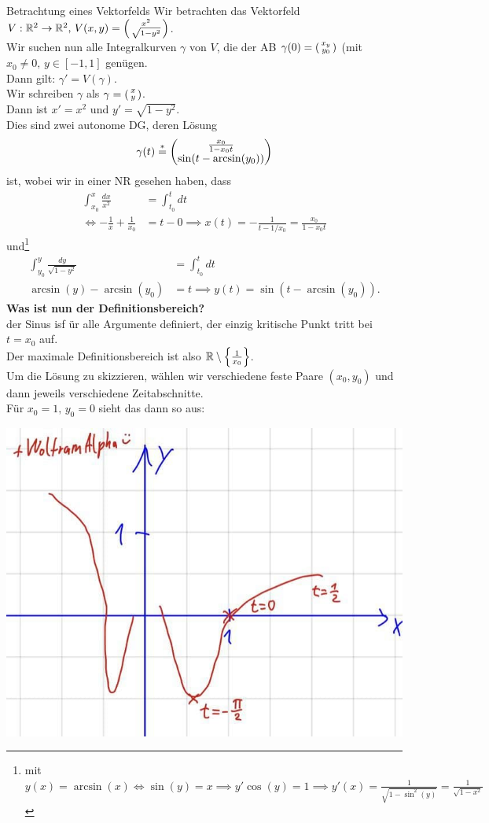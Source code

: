 \begin{Beispiel}
{Betrachtung eines Vektorfelds}
Wir betrachten das Vektorfeld $V:\mathbb{R}^2\to\mathbb{R}^2,\,V(x,y)=\left(\begin{smallmatrix}x^2\\\sqrt{1-y^2}\end{smallmatrix}\right)$.\\
Wir suchen nun alle Integralkurven $\gamma$ von $V$, die der AB $\gamma(0)=\left(\begin{smallmatrix}x_y\\y_0\end{smallmatrix}\right)$ (mit $x_0\neq0,\,y\in[-1,1]$ genügen.\\
Dann gilt: $\gamma'=V(\gamma)$.\\
Wir schreiben $\gamma$ als $\gamma=\left(\begin{smallmatrix}x\\y\end{smallmatrix}\right)$.\\
Dann ist $x'=x^2$ und $y'=\sqrt{1-y^2}$.\\
Dies sind zwei autonome DG, deren Lösung
\begin{equation*}
    \gamma(t)\overset{*}{=}\begin{pmatrix}\frac{x_0}{1-x_0t}\\\sin(t-\arcsin(y_0))\end{pmatrix}
\end{equation*}
ist, wobei wir in einer NR gesehen haben, dass 
\begin{align*}
    \int_{x_0}^x\frac{dx}{x^2}&=\int_{t_0}^tdt\\
    \iff -\frac{1}{x}+\frac{1}{x_0}&=t-0\implies x(t)=-\frac{1}{t-1/x_0}=\frac{x_0}{1-x_0t}
\end{align*}
und\footnote{mit $y(x)=\arcsin(x)\iff \sin(y)=x\implies y'\cos(y)=1\implies y'(x)=\frac{1}{\sqrt{1-\sin^2(y)}}=\frac{1}{\sqrt{1-x^2}}$}
\begin{align*}
    \int_{y_0}^y\frac{dy}{\sqrt{1-y^2}}&=\int_{t_0}^tdt\\
    \arcsin(y)-\arcsin(y_0)&=t\implies y(t)=\sin(t-\arcsin(y_0)).
\end{align*}
\textbf{Was ist nun der Definitionsbereich?}\\
der Sinus isf ür alle Argumente definiert, der einzig kritische Punkt tritt bei $t=x_0$ auf.\\
Der maximale Definitionsbereich ist also $\mathbb{R}\setminus\left\{\frac{1}{x_0}\right\}$.\\
Um die Lösung zu skizzieren, wählen wir verschiedene feste Paare $(x_0,y_0)$ und dann jeweils verschiedene Zeitabschnitte.\\
Für $x_0=1,\,y_0=0$ sieht das dann so aus:
\begin{center}
    \includegraphics[width=.35\textwidth]{Dateien/12Vektorfeld.jpg}

\end{center}
\end{Beispiel}
